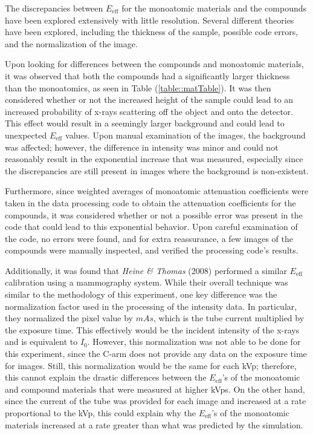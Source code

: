 The discrepancies between $E_{\text{eff}}$ for the monoatomic materials and the compounds have been explored extensively with little resolution. Several different theories have been explored, including the thickness of the sample, possible code errors, and the normalization of the image.

Upon looking for differences between the compounds and monoatomic materials, it was observed that both the compounds had a significantly larger thickness than the monoatomics, as seen in Table (\ref{table::matTable}). It was then considered whether or not the increased height of the sample could lead to an increased probability of x-rays scattering off the object and onto the detector. This effect would result in a seemingly larger background and could lead to unexpected $E_{\text{eff}}$ values. Upon manual examination of the images, the background was affected; however, the difference in intensity was minor and could not reasonably result in the exponential increase that was measured, especially since the discrepancies are still present in images where the background is non-existent.

Furthermore, since weighted averages of monoatomic attenuation coefficients were taken in the data processing code to obtain the attenuation coefficients for the compounds, it was considered whether or not a possible error was present in the code that could lead to this exponential behavior. Upon careful examination of the code, no errors were found, and for extra reassurance, a few images of the compounds were manually inspected, and verified the processing code's results.

Additionally, it was found that \textit{Heine \& Thomas} (2008) \cite{Heine} performed a similar $E_{\text{eff}}$ calibration using a mammography system. While their overall technique was similar to the methodology of this experiment, one key difference was the normalization factor used in the processing of the intensity data. In particular, they normalized the pixel value by $mAs$, which is the tube current multiplied by the exposure time. This effectively would be the incident intensity of the x-rays and is equivalent to $I_0$. However, this normalization was not able to be done for this experiment, since the C-arm does not provide any data on the exposure time for images. Still, this normalization would be the same for each kVp; therefore, this cannot explain the drastic differences between the $E_{\text{eff}}$'s of the monoatomic and compound materials that were measured at higher kVps. On the other hand, since the current of the tube was provided for each image and increased at a rate proportional to the kVp, this could explain why the $E_{\text{eff}}$'s of the monoatomic materials increased at a rate greater than what was predicted by the simulation. 

